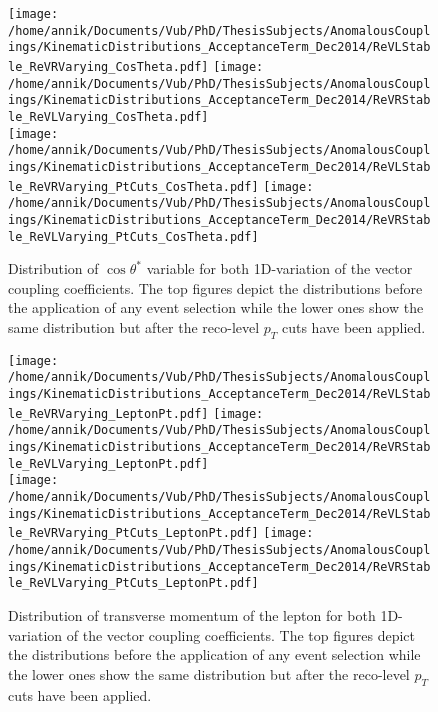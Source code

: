 \begin{figure}[!h]
 \centering
 \texttt{[image: /home/annik/Documents/Vub/PhD/ThesisSubjects/AnomalousCouplings/KinematicDistributions\_AcceptanceTerm\_Dec2014/ReVLStable\_ReVRVarying\_CosTheta.pdf]}
 \texttt{[image: /home/annik/Documents/Vub/PhD/ThesisSubjects/AnomalousCouplings/KinematicDistributions\_AcceptanceTerm\_Dec2014/ReVRStable\_ReVLVarying\_CosTheta.pdf]}\\
 \texttt{[image: /home/annik/Documents/Vub/PhD/ThesisSubjects/AnomalousCouplings/KinematicDistributions\_AcceptanceTerm\_Dec2014/ReVLStable\_ReVRVarying\_PtCuts\_CosTheta.pdf]}
 \texttt{[image: /home/annik/Documents/Vub/PhD/ThesisSubjects/AnomalousCouplings/KinematicDistributions\_AcceptanceTerm\_Dec2014/ReVRStable\_ReVLVarying\_PtCuts\_CosTheta.pdf]}
 \caption{Distribution of $\cos \theta^{*}$ variable for both 1D-variation of the vector coupling coefficients. The top figures depict the distributions before the application of any event selection while the lower ones show the same distribution but after the reco-level $p_T$ cuts have been applied.}
 \label{fig::KinChangeCosTheta}
\end{figure}

\begin{figure}[!h]
 \centering
 \texttt{[image: /home/annik/Documents/Vub/PhD/ThesisSubjects/AnomalousCouplings/KinematicDistributions\_AcceptanceTerm\_Dec2014/ReVLStable\_ReVRVarying\_LeptonPt.pdf]}
 \texttt{[image: /home/annik/Documents/Vub/PhD/ThesisSubjects/AnomalousCouplings/KinematicDistributions\_AcceptanceTerm\_Dec2014/ReVRStable\_ReVLVarying\_LeptonPt.pdf]}\\
 \texttt{[image: /home/annik/Documents/Vub/PhD/ThesisSubjects/AnomalousCouplings/KinematicDistributions\_AcceptanceTerm\_Dec2014/ReVLStable\_ReVRVarying\_PtCuts\_LeptonPt.pdf]}
 \texttt{[image: /home/annik/Documents/Vub/PhD/ThesisSubjects/AnomalousCouplings/KinematicDistributions\_AcceptanceTerm\_Dec2014/ReVRStable\_ReVLVarying\_PtCuts\_LeptonPt.pdf]}
 \caption{Distribution of transverse momentum of the lepton for both 1D-variation of the vector coupling coefficients. The top figures depict the distributions before the application of any event selection while the lower ones show the same distribution but after the reco-level $p_T$ cuts have been applied.}
 \label{fig::KinChangeLeptonPt}
\end{figure}

